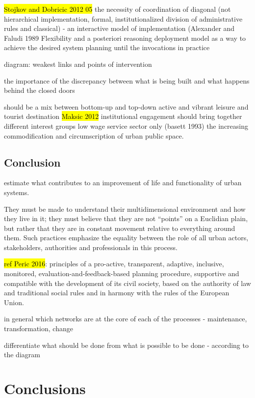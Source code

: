\documentclass[11pt]{report}
\begin{document}
\hl{Stojkov and Dobricic 2012 05}
    the necessity of coordination of diagonal (not hierarchical implementation, formal, institutionalized division of administrative rules and classical) - an interactive model of implementation (Alexander and Faludi 1989
    Flexibility and a posteriori reasoning
deployment model as a way to achieve the desired system planning until the invocations in practice

diagram: weakest links and points of intervention

the importance of the discrepancy between what is being built and what happens behind the closed doors

should be a mix between bottom-up and top-down
active and vibrant leisure and tourist destination
\hl{Maksic 2012}
institutional engagement should bring together different interest groups
low wage service sector only (basett 1993)
\cite{Lehrer and Laidley 2008}
the increasing commodification and circumscription of urban public space. 

\section{Conclusion}

estimate what contributes to an improvement of life and functionality of urban systems.

They must be made to understand their multidimensional environment and how they live in it; they must believe that they are not “points” on a Euclidian plain, but rather that they are in constant movement relative to everything around them. Such practices emphasize the equality between the role of all urban actors, stakeholders, authorities and professionals in this process.

\hl{ref Peric 2016}:
principles of a pro-active, transparent, adaptive, inclusive, monitored, evaluation-and-feedback-based planning procedure, supportive and compatible with the development of its civil society, based on the authority of law and traditional social rules and in harmony with the rules of the European Union.

in general which networks are at the core of each of the processes - maintenance, transformation, change

differentiate what should be done from what is possible to be done - according to the diagram


\chapter{Conclusions}
\end{document}

